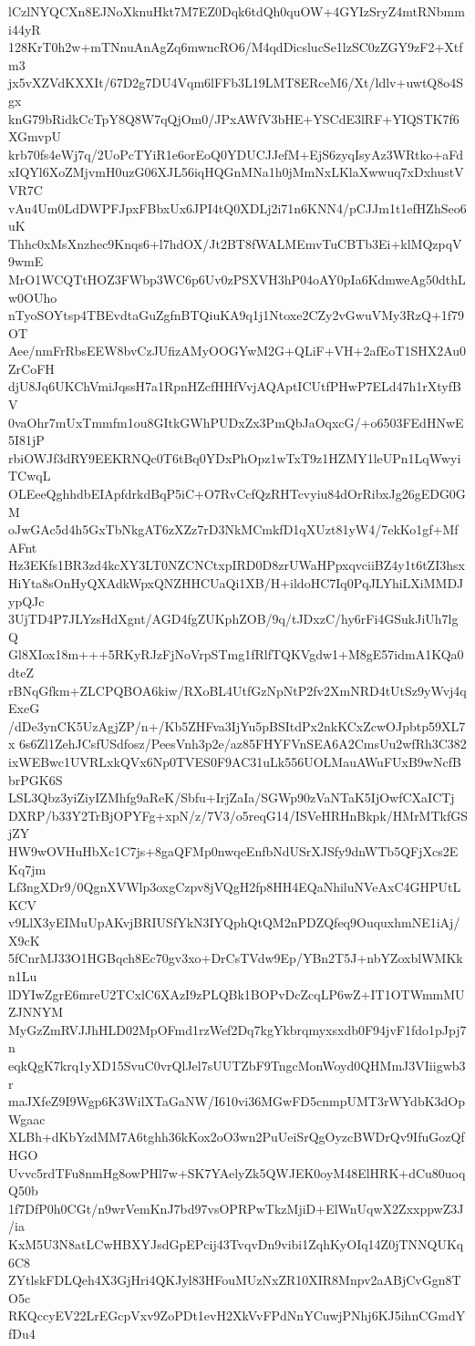 lCzlNYQCXn8EJNoXknuHkt7M7EZ0Dqk6tdQh0quOW+4GYIzSryZ4mtRNbmmi44yR
128KrT0h2w+mTNnuAnAgZq6mwncRO6/M4qdDicslucSe1lzSC0zZGY9zF2+Xtfm3
jx5vXZVdKXXIt/67D2g7DU4Vqm6lFFb3L19LMT8ERceM6/Xt/ldlv+uwtQ8o4Sgx
knG79bRidkCcTpY8Q8W7qQjOm0/JPxAWfV3bHE+YSCdE3lRF+YIQSTK7f6XGmvpU
krb70fs4eWj7q/2UoPcTYiR1e6orEoQ0YDUCJJefM+EjS6zyqIsyAz3WRtko+aFd
xIQYl6XoZMjvmH0uzG06XJL56iqHQGnMNa1h0jMmNxLKlaXwwuq7xDxhustVVR7C
vAu4Um0LdDWPFJpxFBbxUx6JPI4tQ0XDLj2i71n6KNN4/pCJJm1t1efHZhSeo6uK
Thhc0xMsXnzhec9Knqs6+l7hdOX/Jt2BT8fWALMEmvTuCBTb3Ei+klMQzpqV9wmE
MrO1WCQTtHOZ3FWbp3WC6p6Uv0zPSXVH3hP04oAY0pIa6KdmweAg50dthLw0OUho
nTyoSOYtsp4TBEvdtaGuZgfnBTQiuKA9q1j1Ntoxe2CZy2vGwuVMy3RzQ+1f79OT
Aee/nmFrRbsEEW8bvCzJUfizAMyOOGYwM2G+QLiF+VH+2afEoT1SHX2Au0ZrCoFH
djU8Jq6UKChVmiJqssH7a1RpnHZcfHHfVvjAQAptICUtfPHwP7ELd47h1rXtyfBV
0vaOhr7mUxTmmfm1ou8GItkGWhPUDxZx3PmQbJaOqxcG/+o6503FEdHNwE5I81jP
rbiOWJf3dRY9EEKRNQc0T6tBq0YDxPhOpz1wTxT9z1HZMY1leUPn1LqWwyiTCwqL
OLEeeQghhdbEIApfdrkdBqP5iC+O7RvCcfQzRHTcvyiu84dOrRibxJg26gEDG0GM
oJwGAc5d4h5GxTbNkgAT6zXZz7rD3NkMCmkfD1qXUzt81yW4/7ekKo1gf+MfAFnt
Hz3EKfs1BR3zd4kcXY3LT0NZCNCtxpIRD0D8zrUWaHPpxqvciiBZ4y1t6tZI3hsx
HiYta8sOnHyQXAdkWpxQNZHHCUaQi1XB/H+ildoHC7Iq0PqJLYhiLXiMMDJypQJc
3UjTD4P7JLYzsHdXgnt/AGD4fgZUKphZOB/9q/tJDxzC/hy6rFi4GSukJiUh7lgQ
Gl8XIox18m+++5RKyRJzFjNoVrpSTmg1fRlfTQKVgdw1+M8gE57idmA1KQa0dteZ
rBNqGfkm+ZLCPQBOA6kiw/RXoBL4UtfGzNpNtP2fv2XmNRD4tUtSz9yWvj4qExeG
/dDe3ynCK5UzAgjZP/n+/Kb5ZHFva3IjYu5pBSItdPx2nkKCxZcwOJpbtp59XL7x
6s6Zl1ZehJCsfUSdfosz/PeesVnh3p2e/az85FHYFVnSEA6A2CmsUu2wfRh3C382
ixWEBwc1UVRLxkQVx6Np0TVES0F9AC31uLk556UOLMauAWuFUxB9wNcfBbrPGK6S
LSL3Qbz3yiZiyIZMhfg9aReK/Sbfu+IrjZaIa/SGWp90zVaNTaK5IjOwfCXaICTj
DXRP/b33Y2TrBjOPYFg+xpN/z/7V3/o5reqG14/ISVeHRHnBkpk/HMrMTkfGSjZY
HW9wOVHuHbXc1C7js+8gaQFMp0nwqeEnfbNdUSrXJSfy9dnWTb5QFjXcs2EKq7jm
Lf3ngXDr9/0QgnXVWlp3oxgCzpv8jVQgH2fp8HH4EQaNhiluNVeAxC4GHPUtLKCV
v9LlX3yEIMuUpAKvjBRIUSfYkN3IYQphQtQM2nPDZQfeq9OuquxhmNE1iAj/X9cK
5fCnrMJ33O1HGBqch8Ec70gv3xo+DrCsTVdw9Ep/YBn2T5J+nbYZoxblWMKkn1Lu
lDYIwZgrE6mreU2TCxlC6XAzI9zPLQBk1BOPvDcZcqLP6wZ+IT1OTWmmMUZJNNYM
MyGzZmRVJJhHLD02MpOFmd1rzWef2Dq7kgYkbrqmyxsxdb0F94jvF1fdo1pJpj7n
eqkQgK7krq1yXD15SvuC0vrQlJel7sUUTZbF9TngcMonWoyd0QHMmJ3VIiigwb3r
maJXfeZ9I9Wgp6K3WilXTaGaNW/I610vi36MGwFD5cnmpUMT3rWYdbK3dOpWgaac
XLBh+dKbYzdMM7A6tghh36kKox2oO3wn2PuUeiSrQgOyzcBWDrQv9IfuGozQfHGO
Uvvc5rdTFu8nmHg8owPHl7w+SK7YAelyZk5QWJEK0oyM48ElHRK+dCu80uoqQ50b
1f7DfP0h0CGt/n9wrVemKnJ7bd97vsOPRPwTkzMjiD+ElWnUqwX2ZxxppwZ3J/ia
KxM5U3N8atLCwHBXYJsdGpEPcij43TvqvDn9vibi1ZqhKyOIq14Z0jTNNQUKq6C8
ZYtlskFDLQeh4X3GjHri4QKJyl83HFouMUzNxZR10XIR8Mnpv2aABjCvGgn8TO5c
RKQccyEV22LrEGcpVxv9ZoPDt1evH2XkVvFPdNnYCuwjPNhj6KJ5ihnCGmdYfDu4
